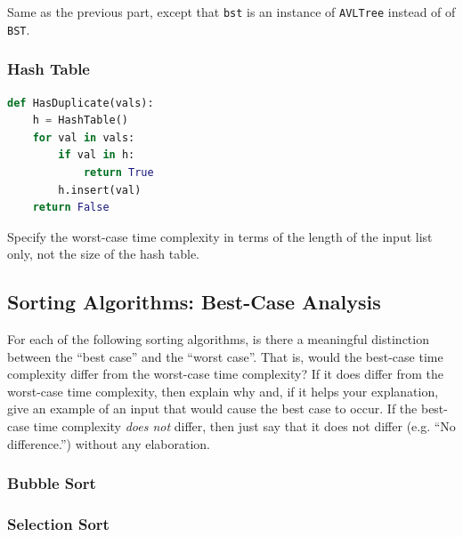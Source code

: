 \documentclass{article}
\begin{document}
Same as the previous part, except that \lstinline{bst} is an instance of \lstinline{AVLTree} instead of of \lstinline{BST}.

\begin{mdframed}
\vspace{3em}
\end{mdframed}

\subsubsection{Hash Table}

\begin{lstlisting}[language=Python]
def HasDuplicate(vals):
    h = HashTable()
    for val in vals:
        if val in h:
            return True
        h.insert(val)
    return False
\end{lstlisting}

Specify the worst-case time complexity in terms of the length of the input list only, not the size of the hash table.

\begin{mdframed}
\vspace{3em}
\end{mdframed}

\subsection{Sorting Algorithms: Best-Case Analysis}

For each of the following sorting algorithms, is there a meaningful distinction between the ``best case'' and the ``worst case''. That is, would the best-case time complexity differ from the worst-case time complexity? If it does differ from the worst-case time complexity, then explain why and, if it helps your explanation, give an example of an input that would cause the best case to occur. If the best-case time complexity \textit{does not} differ, then just say that it does not differ (e.g. ``No difference.'') without any elaboration.

\subsubsection{Bubble Sort}

\begin{mdframed}
\vspace{3em}
\end{mdframed}

\subsubsection{Selection Sort}
\end{document}
